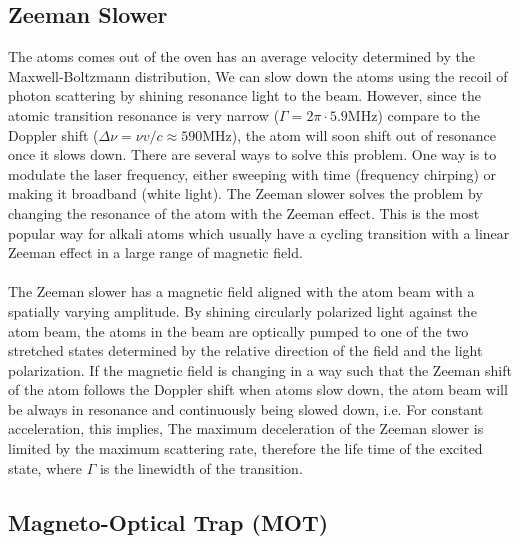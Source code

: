 \subsection{Zeeman Slower}\label{theory:zeeman}

The atoms comes out of the oven has an average velocity determined by the Maxwell-Boltzmann distribution,
We can slow down the atoms using the recoil of photon scattering by shining resonance light to the beam. However, since the atomic transition resonance is very narrow ($\Gamma=2\pi\cdot5.9\text{MHz}$) compare to the Doppler shift ($\Delta\nu=\nu v/c\approx590\text{MHz}$), the atom will soon shift out of resonance once it slows down. There are several ways to solve this problem. One way is to modulate the laser frequency, either sweeping with time (frequency chirping) or making it broadband (white light). The Zeeman slower solves the problem by changing the resonance of the atom with the Zeeman effect. This is the most popular way for alkali atoms which usually have a cycling transition with a linear Zeeman effect in a large range of magnetic field.\\
\\
The Zeeman slower has a magnetic field aligned with the atom beam with a spatially varying amplitude. By shining circularly polarized light against the atom beam, the atoms in the beam are optically pumped to one of the two stretched states determined by the relative direction of the field and the light polarization. If the magnetic field is changing in a way such that the Zeeman shift of the atom follows the Doppler shift when atoms slow down, the atom beam will be always in resonance and continuously being slowed down, i.e.
For constant acceleration, this implies,
The maximum deceleration of the Zeeman slower is limited by the maximum scattering rate, therefore the life time of the excited state,
where $\Gamma$ is the linewidth of the transition.

\subsection{Magneto-Optical Trap (MOT)}\label{theory:mot}

